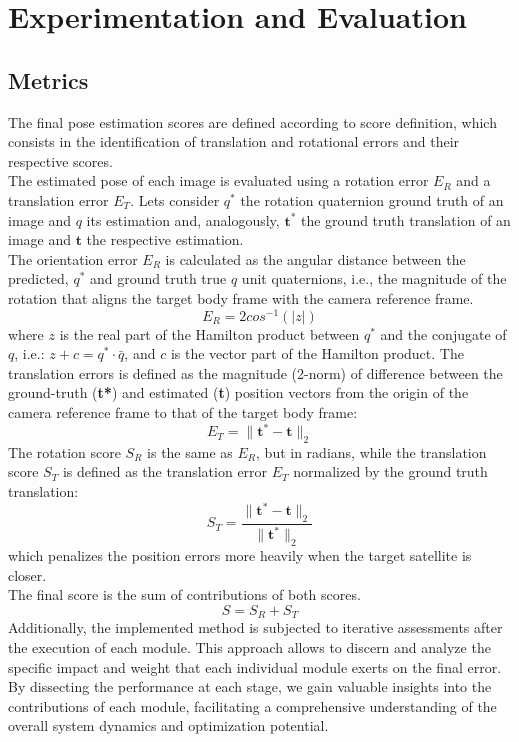 \section{Experimentation and Evaluation}

\subsection{Metrics}
The final pose estimation scores are defined according to \cite{KPEC} score definition, which consists in the identification of translation and rotational errors and their respective scores.\\
The estimated pose of each image is evaluated using a rotation error $E_R$ and a translation error $E_T$. Lets consider $q^*$ the rotation quaternion ground truth of an image and $q$ its estimation and, analogously, $\textbf{t}^*$ the ground truth translation of an image and $\textbf{t}$ the respective estimation.\\
The orientation error $E_R$ is calculated as the angular distance between the predicted, $q^*$ and ground truth true $q$ unit quaternions, i.e., the magnitude of the rotation that aligns the target body frame with the camera reference frame.
\begin{equation}
    E_R = 2cos^{-1}(|z|)
\end{equation}
where $z$ is the real part of the Hamilton product between $q^*$ and the conjugate of $q$, i.e.: \(z + c = q^*\cdot \bar{q}\), and $c$ is the vector part of the Hamilton product.
The translation errors is defined as the magnitude (2-norm) of difference between the ground-truth (\textbf{t*}) and estimated (\textbf{t}) position vectors from the origin of the camera reference frame to that of the target body frame:
\begin{equation}
    E_T = \|\textbf{t}^*-\textbf{t}\|_2
\end{equation}
The rotation score $S_R$ is the same as $E_R$, but in radians, while the translation score $S_T$ is defined as the translation error $E_T$ normalized by the ground truth translation:
\begin{equation}
    S_T = \frac{\|\textbf{t}^*-\textbf{t}\|_2}{\|\textbf{t}^*\|_2}
\end{equation}
which penalizes the position errors more heavily when the target satellite is closer.\\
The final score is the sum of contributions of both scores.
\begin{equation}
    S = S_R + S_T
\end{equation}
Additionally, the implemented method is subjected to iterative assessments after the execution of each module. This approach allows to discern and analyze the specific impact and weight that each individual module exerts on the final error. By dissecting the performance at each stage, we gain valuable insights into the contributions of each module, facilitating a comprehensive understanding of the overall system dynamics and optimization potential.

